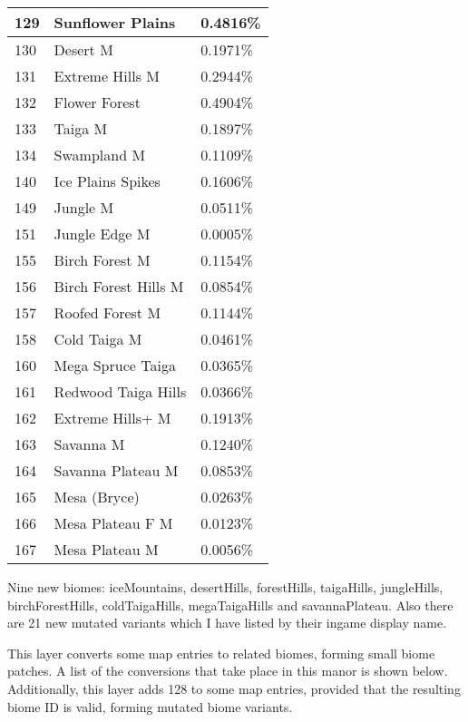 \documentclass{article}
\begin{document}
	\newpage\noindent
	\begin{tabular}{|l|l|l|}\hline
		129    & Sunflower Plains     & 0.4816\%\\\hline
		130    & Desert M             & 0.1971\%\\\hline
		131    & Extreme Hills M      & 0.2944\%\\\hline
		132    & Flower Forest        & 0.4904\%\\\hline
		133    & Taiga M              & 0.1897\%\\\hline
		134    & Swampland M          & 0.1109\%\\\hline
		140    & Ice Plains Spikes    & 0.1606\%\\\hline
		149    & Jungle M             & 0.0511\%\\\hline
		151    & Jungle Edge M        & 0.0005\%\\\hline
		155    & Birch Forest M       & 0.1154\%\\\hline
		156    & Birch Forest Hills M & 0.0854\%\\\hline
		157    & Roofed Forest M      & 0.1144\%\\\hline
		158    & Cold Taiga M         & 0.0461\%\\\hline
		160    & Mega Spruce Taiga    & 0.0365\%\\\hline
		161    & Redwood Taiga Hills  & 0.0366\%\\\hline
		162    & Extreme Hills+ M     & 0.1913\%\\\hline
		163    & Savanna M            & 0.1240\%\\\hline
		164    & Savanna Plateau M    & 0.0853\%\\\hline
		165    & Mesa (Bryce)         & 0.0263\%\\\hline
		166    & Mesa Plateau F M     & 0.0123\%\\\hline
		167    & Mesa Plateau M       & 0.0056\%\\\hline
	\end{tabular}
	
	\medskip\noindent
	Nine new biomes: iceMountains, desertHills, forestHills, taigaHills, jungleHills, birchForestHills, coldTaigaHills, megaTaigaHills and savannaPlateau. Also there are 21 new mutated variants which I have listed by their ingame display name.
	
	This layer converts some map entries to related biomes, forming small biome patches. A list of the conversions that take place in this manor is shown below. Additionally, this layer adds 128 to some map entries, provided that the resulting biome ID is valid, forming mutated biome variants.
	
\end{document}
